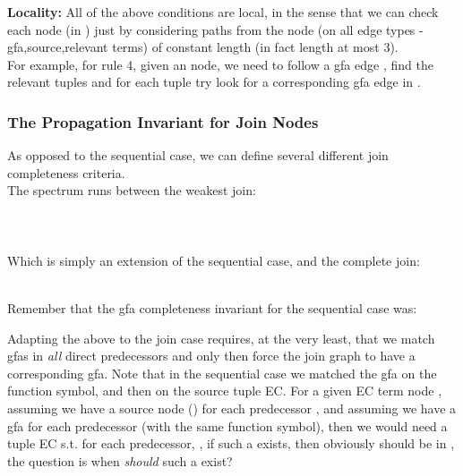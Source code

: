 \noindent \textbf{Locality:}
All of the above conditions are local, in the sense that we can check each node (in ) 
just by considering paths from the node (on all edge types - gfa,source,relevant terms) of constant length (in fact length at most 3).\\
For example, for rule 4, given an  node, we need to follow a gfa edge , 
find the relevant tuples and for each tuple try look for a corresponding gfa edge  in .

\subsubsection*{The Propagation Invariant for Join Nodes}
As opposed to the sequential case, we can define several different join completeness criteria.\\
The spectrum runs between the weakest join:\\
\\
\\
\\
Which is simply an extension of the sequential case, and the complete join:\\
\\

Remember that the gfa completeness invariant for the sequential case was:
\\

Adapting the above to the join case requires, at the very least, that we match gfas in \emph{all} direct predecessors and only then force the join graph to have a corresponding gfa. Note that in the sequential case we matched the gfa on the function symbol, and then on the source tuple EC. 
For a given EC term node , assuming we have a source node  () for each predecessor ,
and assuming we have a gfa  for each predecessor (with the same function symbol), 
then we would need a tuple EC  s.t. for each predecessor, ,
if such a  exists, then obviously  should be in , the question is when \emph{should} such a  exist?

